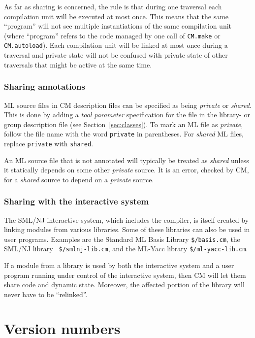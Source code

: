 \documentclass[titlepage,letterpaper]{article}
\begin{document}
As far as sharing is concerned, the rule is that during one traversal
each compilation unit will be executed at most once.  This means that
the same ``program'' will not see multiple instantiations of the same
compilation unit (where ``program'' refers to the code managed by one
call of {\tt CM.make} or {\tt CM.autoload}).  Each compilation unit
will be linked at most once during a traversal and private state
will not be confused with private state of other traversals that might
be active at the same time.


\subsubsection{Sharing annotations}

ML source files in CM description files can be specified as being {\em
private} or {\em shared}.  This is done by adding a {\em tool
parameter} specification for the file in the library- or group
description file (see Section~\ref{sec:classes}). To mark an ML file
as {\em private}, follow the file name with the word {\tt private} in
parentheses.  For {\em shared} ML files, replace {\tt private} with
{\tt shared}.

An ML source file that is not annotated will typically be treated as
{\em shared} unless it statically depends on some other {\em private}
source.  It is an error, checked by CM, for a {\em shared} source to
depend on a {\em private} source.

\subsubsection{Sharing with the interactive system}

The SML/NJ interactive system, which includes the compiler, is itself
created by linking modules from various libraries. Some of these
libraries can also be used in user programs.  Examples are the
Standard ML Basis Library {\tt \$/basis.cm}, the SML/NJ library {\tt
\$/smlnj-lib.cm}, and the ML-Yacc library {\tt \$/ml-yacc-lib.cm}.

If a module from a library is used by both the interactive system and
a user program running under control of the interactive system, then
CM will let them share code and dynamic state.  Moreover, the affected
portion of the library will never have to be ``relinked''.

\section{Version numbers}
\label{sec:versions}
\end{document}
